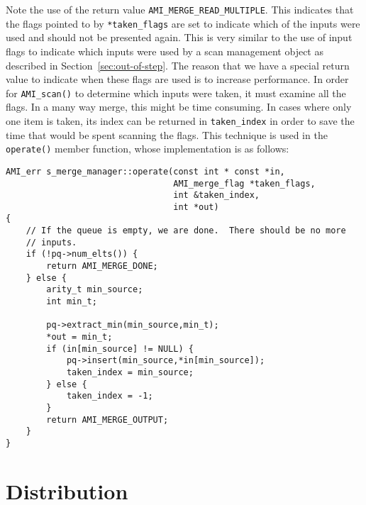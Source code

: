 Note the use of the return value \verb|AMI_MERGE_READ_MULTIPLE|.  This
indicates that the flags pointed to by \verb|*taken_flags| are set to
indicate which of the inputs were used and should not be presented
again.  This is very similar to the use of input flags to indicate
which inputs were used by a scan management object as described in
Section~\ref{sec:out-of-step}.  The reason that we have a special
return value to indicate when these flags are used is to increase
performance.  In order for \verb|AMI_scan()| to determine which inputs
were taken, it must examine all the flags.  In a many way merge, this
might be time consuming.  In cases where only one item is taken, its
index can be returned in \verb|taken_index| in order to save the time
that would be spent scanning the flags.  This technique is used in the
\verb|operate()| member function, whose implementation is as follows:

\begin{verbatim}
AMI_err s_merge_manager::operate(const int * const *in,
                                 AMI_merge_flag *taken_flags,
                                 int &taken_index,
                                 int *out)
{
    // If the queue is empty, we are done.  There should be no more
    // inputs.
    if (!pq->num_elts()) {
        return AMI_MERGE_DONE;
    } else {
        arity_t min_source;
        int min_t;

        pq->extract_min(min_source,min_t);
        *out = min_t;
        if (in[min_source] != NULL) {
            pq->insert(min_source,*in[min_source]);
            taken_index = min_source;
        } else {
            taken_index = -1;
        }
        return AMI_MERGE_OUTPUT;
    }
}
\end{verbatim}


\section{Distribution} \label{sec:distribution}

\tobewritten


%


